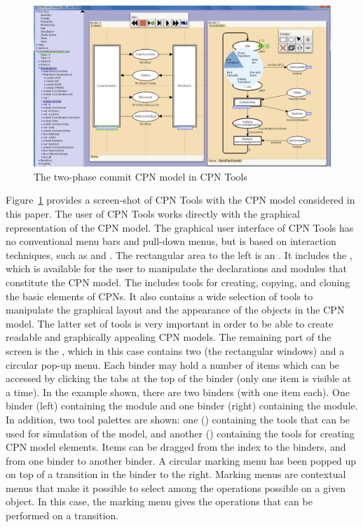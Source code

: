 \begin{figure}[t]
\centering
\includegraphics[scale=.37]{figures/cpntools.png}
\caption{The two-phase commit CPN model in CPN Tools}
\label{fig:cpntools}
\end{figure}

Figure~\ref{fig:cpntools} provides a screen-shot of CPN Tools with the
CPN model considered in this paper. The user of CPN Tools works
directly with the graphical representation of the CPN model. The
graphical user interface of CPN Tools has no conventional menu bars
and pull-down menus, but is based on interaction techniques, such as
 and . The rectangular
area to the left is an . It includes the , which is available for the user to manipulate the declarations
and modules that constitute the CPN model. The 
includes tools for creating, copying, and cloning the basic elements
of CPNs. It also contains a wide selection of tools to manipulate the
graphical layout and the appearance of the objects in the CPN
model. The latter set of tools is very important in order to be able
to create readable and graphically appealing CPN models. The remaining
part of the screen is the , which in this case
contains two  (the rectangular windows) and a
circular pop-up menu. Each binder may hold a number of items which can
be accessed by clicking the tabs at the top of the binder (only one
item is visible at a time). In the example shown, there are two
binders (with one item each). One binder (left) containing the
 module and one binder (right) containing the
 module. In addition, two tool palettes are
shown: one () containing the tools that can be used for
simulation of the model, and another () containing the
tools for creating CPN model elements. Items can be dragged from the
index to the binders, and from one binder to another binder. A
circular marking menu has been popped up on top of a transition in the
binder to the right. Marking menus are contextual menus that make it
possible to select among the operations possible on a given object. In
this case, the marking menu gives the operations that can be performed
on a transition.




